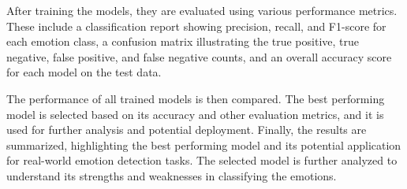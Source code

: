 After training the models, they are evaluated using various performance metrics. These include a classification report showing precision, recall, and F1-score for each emotion class, a confusion matrix illustrating the true positive, true negative, false positive, and false negative counts, and an overall accuracy score for each model on the test data.

The performance of all trained models is then compared. The best performing model is selected based on its accuracy and other evaluation metrics, and it is used for further analysis and potential deployment. Finally, the results are summarized, highlighting the best performing model and its potential application for real-world emotion detection tasks. The selected model is further analyzed to understand its strengths and weaknesses in classifying the emotions.
